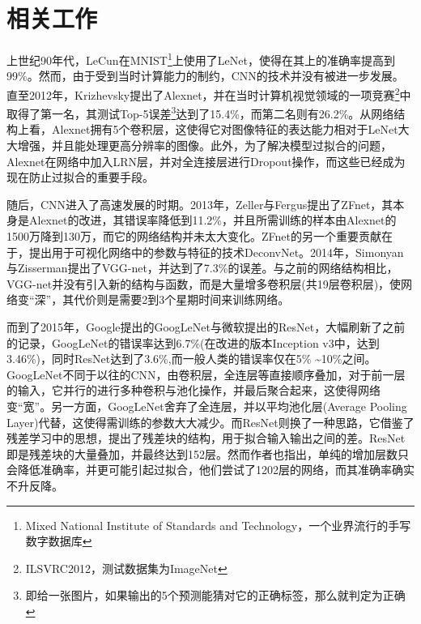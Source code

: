 \chapter{相关工作}

上世纪90年代，LeCun在MNIST\footnote{Mixed National Institute of Standards and Technology，一个业界流行的手写数字数据库}上使用了LeNet，使得在其上的准确率提高到99\%。然而，由于受到当时计算能力的制约，CNN的技术并没有被进一步发展。直至2012年，Krizhevsky提出了Alexnet，并在当时计算机视觉领域的一项竞赛\footnote{ILSVRC2012，测试数据集为ImageNet}中取得了第一名，其测试Top-5误差\footnote{即给一张图片，如果输出的5个预测能猜对它的正确标签，那么就判定为正确}达到了15.4\%，而第二名则有26.2\%。从网络结构上看，Alexnet拥有5个卷积层，这使得它对图像特征的表达能力相对于LeNet大大增强，并且能处理更高分辨率的图像。此外，为了解决模型过拟合的问题，Alexnet在网络中加入LRN层，并对全连接层进行Dropout操作，而这些已经成为现在防止过拟合的重要手段。

随后，CNN进入了高速发展的时期。2013年，Zeller与Fergus提出了ZFnet，其本身是Alexnet的改进，其错误率降低到11.2\%，并且所需训练的样本由Alexnet的1500万降到130万，而它的网络结构并未太大变化。ZFnet的另一个重要贡献在于，提出用于可视化网络中的参数与特征的技术DeconvNet。2014年，Simonyan与Zisserman提出了VGG-net，并达到了7.3\%的误差。与之前的网络结构相比，VGG-net并没有引入新的结构与函数，而是大量增多卷积层(共19层卷积层)，使网络变“深”，其代价则是需要2到3个星期时间来训练网络。

而到了2015年，Google提出的GoogLeNet与微软提出的ResNet，大幅刷新了之前的记录，GoogLeNet的错误率达到6.7\%(在改进的版本Inception v3中，达到3.46\%)，同时ResNet达到了3.6\%,而一般人类的错误率仅在5\% \textasciitilde 10\%之间。GoogLeNet不同于以往的CNN，由卷积层，全连层等直接顺序叠加，对于前一层的输入，它并行的进行多种卷积与池化操作，并最后聚合起来，这使得网络变“宽”。另一方面，GoogLeNet舍弃了全连层，并以平均池化层(Average Pooling Layer)代替，这使得需训练的参数大大减少。而ResNet则换了一种思路，它借鉴了残差学习中的思想，提出了残差块的结构，用于拟合输入输出之间的差。ResNet即是残差块的大量叠加，并最终达到152层。然而作者也指出，单纯的增加层数只会降低准确率，并更可能引起过拟合，他们尝试了1202层的网络，而其准确率确实不升反降。